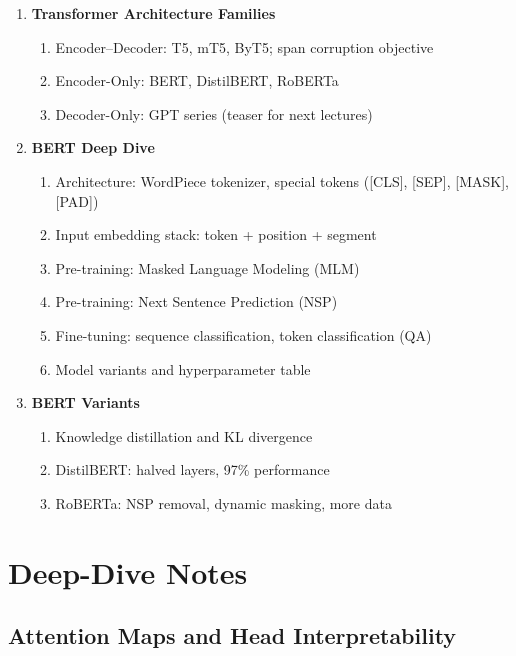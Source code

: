 \documentclass[11pt, a4paper]{article}
\begin{document}
\begin{enumerate}[label=\textbf{\arabic*.}, leftmargin=2em]
  \item \textbf{Transformer Architecture Families}
    \begin{enumerate}[label=\arabic{enumi}.\arabic*]
      \item Encoder--Decoder: T5, mT5, ByT5; span corruption objective
      \item Encoder-Only: BERT, DistilBERT, RoBERTa
      \item Decoder-Only: GPT series (teaser for next lectures)
    \end{enumerate}

  \item \textbf{BERT Deep Dive}
    \begin{enumerate}[label=\arabic{enumi}.\arabic*]
      \item Architecture: WordPiece tokenizer, special tokens ([CLS], [SEP], [MASK], [PAD])
      \item Input embedding stack: token + position + segment
      \item Pre-training: Masked Language Modeling (MLM)
      \item Pre-training: Next Sentence Prediction (NSP)
      \item Fine-tuning: sequence classification, token classification (QA)
      \item Model variants and hyperparameter table
    \end{enumerate}

  \item \textbf{BERT Variants}
    \begin{enumerate}[label=\arabic{enumi}.\arabic*]
      \item Knowledge distillation and KL divergence
      \item DistilBERT: halved layers, 97\% performance
      \item RoBERTa: NSP removal, dynamic masking, more data
    \end{enumerate}
\end{enumerate}

\newpage
\section{Deep-Dive Notes}

\subsection{Attention Maps and Head Interpretability}
\end{document}
